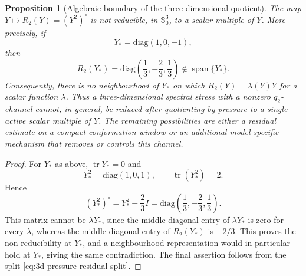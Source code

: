 \documentclass[11pt]{article}
\newtheorem{proposition}{Proposition}[section]
\newcommand{\Sym}{\mathbb S}
\newcommand{\tr}{\operatorname{tr}}
\begin{document}
\begin{proposition}[Algebraic boundary of the three-dimensional quotient]
\label{prop:3d-algebraic-boundary}
The map \(Y\mapsto R_2(Y)=(Y^2)^\circ\) is not reducible, in
\(\Sym^3_0\), to a scalar multiple of \(Y\).  More precisely, if
\[
  Y_* = \mathrm{diag}(1,0,-1),
\]
then
\[
  R_2(Y_*)=\mathrm{diag}\left(\frac13,-\frac23,\frac13\right)
  \notin \operatorname{span}\{Y_*\} .
\]
Consequently, there is no neighbourhood of \(Y_*\) on which
\(R_2(Y)=\lambda(Y)Y\) for a scalar function \(\lambda\).  Thus a
three-dimensional spectral stress with a nonzero \(q_2\)-channel cannot, in
general, be reduced after quotienting by pressure to a single active scalar
multiple of \(Y\).  The remaining possibilities are either a residual estimate
on a compact conformation window or an additional model-specific mechanism that
removes or controls this channel.
\end{proposition}

\begin{proof}
For \(Y_*\) as above, \(\tr Y_*=0\) and
\[
  Y_*^2=\mathrm{diag}(1,0,1),\qquad \tr(Y_*^2)=2.
\]
Hence
\[
  (Y_*^2)^\circ=Y_*^2-\frac23 I
  =\mathrm{diag}\left(\frac13,-\frac23,\frac13\right).
\]
This matrix cannot be \(\lambda Y_*\), since the middle diagonal entry of
\(\lambda Y_*\) is zero for every \(\lambda\), whereas the middle diagonal entry
of \(R_2(Y_*)\) is \(-2/3\).  This proves the non-reducibility at \(Y_*\), and a
neighbourhood representation would in particular hold at \(Y_*\), giving the
same contradiction.  The final assertion follows from the split
\eqref{eq:3d-pressure-residual-split}.
\end{proof}
\end{document}
